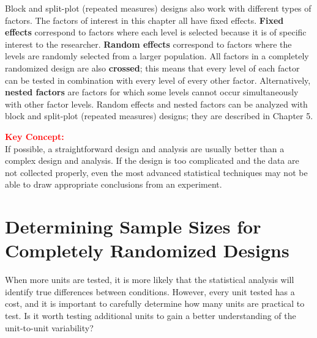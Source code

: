 \documentclass[
]{report}
\begin{document}
Block and split-plot (repeated measures) designs also work with different types of factors. The factors of interest in this chapter all have fixed effects. \textbf{Fixed effects} correspond to factors where each level is selected because it is of specific interest to the researcher. \textbf{Random effects} correspond to factors where the levels are randomly selected from a larger population. All factors in a completely randomized design are also \textbf{crossed}; this means that every level of each factor can be tested in combination with every level of every other factor. Alternatively, \textbf{nested factors} are factors for which some levels cannot occur simultaneously with other factor levels. Random effects and nested factors can be analyzed with block and split-plot (repeated measures) designs; they are described in Chapter 5.
\normalsize

\large

\textbf{\textcolor{red}{Key Concept:}}\\
\color{red}
If possible, a straightforward design and analysis are usually better than a complex design and analysis. If the design is too complicated and the data are not collected properly, even the most advanced statistical techniques may not be able to draw appropriate conclusions from an experiment.
\color{black}
\normalsize

\section{\texorpdfstring{\textbf{Determining Sample Sizes for Completely Randomized Designs}}{Determining Sample Sizes for Completely Randomized Designs}}\label{determining-sample-sizes-for-completely-randomized-designs}

When more units are tested, it is more likely that the statistical analysis will identify true differences between conditions. However, every unit tested has a cost, and it is important to carefully determine how many units are practical to test. Is it worth testing additional units to gain a better understanding of the unit-to-unit variability?
\end{document}
